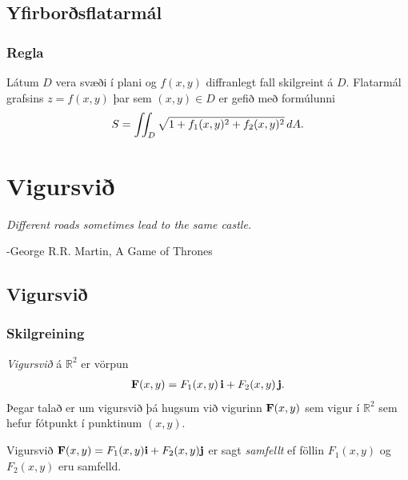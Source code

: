 \documentclass[a4paper,10pt,icelandic]{sphinxmanual}
\begin{document}
\section{Yfirborðsflatarmál}
\label{Kafli4:yfirborsflatarmal}

\subsection{Regla}
\label{Kafli4:id25}
Látum \(D\) vera svæði í plani og \(f(x,y)\) diffranlegt fall
skilgreint á \(D\). Flatarmál grafsins \(z=f(x,y)\) þar sem
\((x,y)\in D\) er gefið með formúlunni
\begin{gather}
\begin{split}\displaystyle S=\int\!\!\!\int_D \sqrt{1+f_1(x,y)^2+f_2(x,y)^2}\,dA.\end{split}\notag
\end{gather}

\chapter{Vigursvið}
\label{Kafli5::doc}\label{Kafli5:vigursvi}
\emph{Different roads sometimes lead to the same castle.}

-George R.R. Martin, A Game of Thrones


\section{Vigursvið}
\label{Kafli5:id1}

\subsection{Skilgreining}
\label{Kafli5:skilgreining}\label{Kafli5:index-0}
\textit{Vigursvið} á \({\mathbb  R}^2\) er vörpun
\begin{gather}
\begin{split}\displaystyle \mbox{${\bf F}$}(x,y)=F_1(x,y)\,\mbox{${\bf i}$}+F_2(x,y)\,\mbox{${\bf j}$}.\end{split}\notag
\end{gather}
Þegar talað er um vigursvið þá hugsum við vigurinn
\(\mbox{${\bf F}$}(x,y)\) sem vigur í \({\mathbb  R}^2\) sem
hefur fótpunkt í punktinum \((x,y)\).

Vigursvið
\(\mbox{${\bf F}$}(x,y)=F_1(x,y)\mbox{${\bf i}$}+F_2(x,y)\mbox{${\bf j}$}\)
er sagt \textit{samfellt} ef föllin \(F_1(x,y)\) og \(F_2(x,y)\) eru
samfelld.
\end{document}
